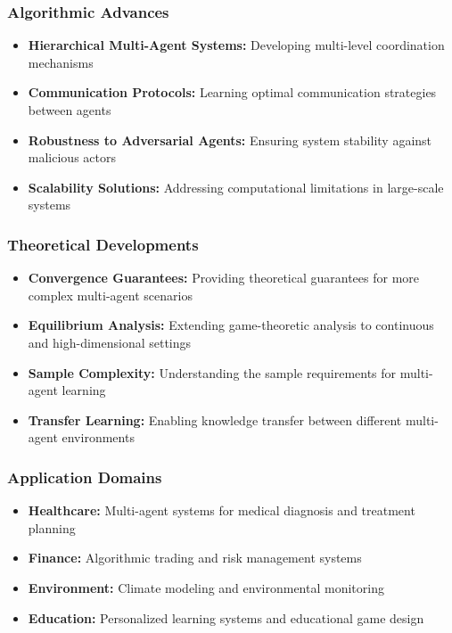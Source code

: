 \documentclass[conference]{IEEEtran}
\begin{document}
{{\subsubsection{Algorithmic Advances}

\begin{itemize}
    \item \textbf{Hierarchical Multi-Agent Systems:} Developing multi-level coordination mechanisms
    \item \textbf{Communication Protocols:} Learning optimal communication strategies between agents
    \item \textbf{Robustness to Adversarial Agents:} Ensuring system stability against malicious actors
    \item \textbf{Scalability Solutions:} Addressing computational limitations in large-scale systems
\end{itemize}

\subsubsection{Theoretical Developments}

\begin{itemize}
    \item \textbf{Convergence Guarantees:} Providing theoretical guarantees for more complex multi-agent scenarios
    \item \textbf{Equilibrium Analysis:} Extending game-theoretic analysis to continuous and high-dimensional settings
    \item \textbf{Sample Complexity:} Understanding the sample requirements for multi-agent learning
    \item \textbf{Transfer Learning:} Enabling knowledge transfer between different multi-agent environments
\end{itemize}

\subsubsection{Application Domains}

\begin{itemize}
    \item \textbf{Healthcare:} Multi-agent systems for medical diagnosis and treatment planning
    \item \textbf{Finance:} Algorithmic trading and risk management systems
    \item \textbf{Environment:} Climate modeling and environmental monitoring
    \item \textbf{Education:} Personalized learning systems and educational game design
\end{itemize}

}}
\end{document}

